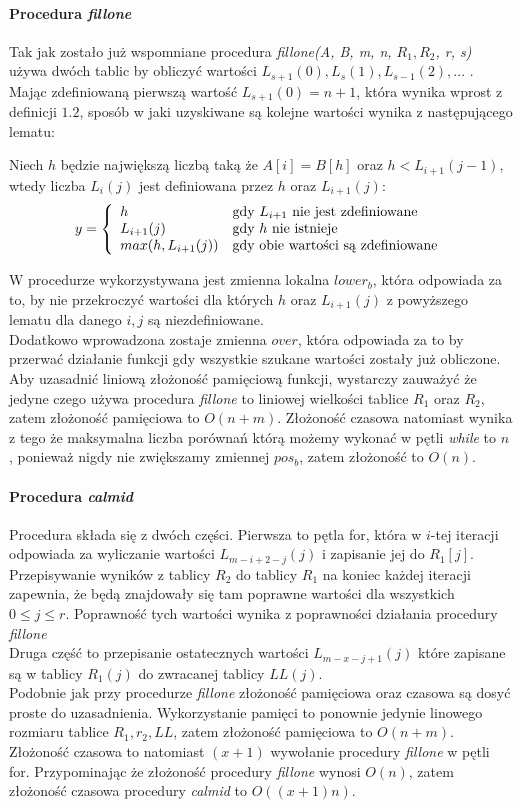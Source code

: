 \paragraph{Procedura \textit{fillone}}
Tak jak zostało już wspomniane procedura \textit{fillone(A, B, m, n, $R_1, R_2$, r, s)} używa dwóch tablic by obliczyć wartości $L_{s+1}(0), L_s(1), L_{s-1}(2), ...$ . Mając zdefiniowaną pierwszą wartość $L_{s+1}(0) = n + 1$, która wynika wprost z definicji $1.2$, sposób w jaki uzyskiwane są kolejne wartości wynika z następującego lematu:
\begin{lemma}{}{}
Niech $h$ będzie największą liczbą taką że $A[i] = B[h]$ oraz $h < L_{i+1}(j - 1)$, wtedy liczba $L_i(j)$ jest definiowana przez $h$ oraz $L_{i+1}(j)$:
$$
y = \left\{ \begin{array}{ll}
h & \textrm{gdy $ L_{i+1} $ nie jest zdefiniowane}\\
L_{i+1}(j) & \textrm{gdy $ h $ nie istnieje}\\
max(h, L_{i+1}(j)) & \textrm{gdy obie wartości są zdefiniowane}
\end{array} \right.
$$
\end{lemma}
W procedurze wykorzystywana jest zmienna lokalna $lower_b$, która odpowiada za to, by nie przekroczyć wartości dla których $h$ oraz $L_{i+1}(j)$ z powyższego lematu dla danego $i, j$ są niezdefiniowane.\\
Dodatkowo wprowadzona zostaje zmienna $over$, która odpowiada za to by przerwać działanie funkcji gdy wszystkie szukane wartości zostały już obliczone.
Aby uzasadnić liniową złożoność pamięciową funkcji, wystarczy zauważyć że jedyne czego używa procedura \textit{fillone} to liniowej wielkości tablice $R_1$ oraz $R_2$, zatem złożoność pamięciowa to $O(n + m)$.
Złożoność czasowa natomiast wynika z tego że maksymalna liczba porównań którą możemy wykonać w pętli \textit{while} to $n$, ponieważ nigdy nie zwiększamy zmiennej $pos_b$, zatem złożoność to $O(n)$.
\paragraph{Procedura \textit{calmid}}
Procedura składa się z dwóch części. Pierwsza to pętla for, która w $i$-tej iteracji odpowiada za wyliczanie wartości $L_{m-i+2-j}(j)$ i zapisanie jej do $R_1[j]$. Przepisywanie wyników z tablicy $R_2$ do tablicy $R_1$ na koniec każdej iteracji zapewnia, że będą znajdowały się tam poprawne wartości dla wszystkich $0 \leq j \leq r$. Poprawność tych wartości wynika z poprawności działania procedury \textit{fillone} \\
Druga część to przepisanie ostatecznych wartości $L_{m-x-j+1}(j)$ które zapisane są w tablicy $R_1(j)$ do zwracanej tablicy $LL(j)$.\\
Podobnie jak przy procedurze \textit{fillone} złożoność pamięciowa oraz czasowa są dosyć proste do uzasadnienia.
Wykorzystanie pamięci to ponownie jedynie linowego rozmiaru tablice $R_1, r_2, LL$, zatem złożoność pamięciowa to $O(n + m)$.\\
Złożoność czasowa to natomiast $(x + 1)$ wywołanie procedury \textit{fillone} w pętli for. Przypominając że złożoność procedury \textit{fillone} wynosi $O(n)$, zatem złożoność czasowa procedury \textit{calmid} to $O((x+1)n)$.
